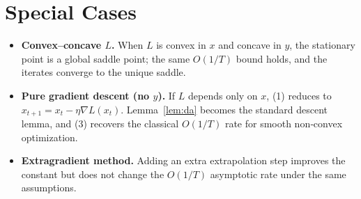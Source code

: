 \documentclass{article}
\begin{document}
\section*{Special Cases}
\begin{itemize}
\item \textbf{Convex–concave $L$.}  When $L$ is convex in $x$ and concave in $y$,
the stationary point is a global saddle point; the same $O(1/T)$ bound holds,
and the iterates converge to the unique saddle.
\item \textbf{Pure gradient descent (no $y$).}
If $L$ depends only on $x$, (1) reduces to $x_{t+1}=x_t-\eta\nabla L(x_t)$.
Lemma~\ref{lem:da} becomes the standard descent lemma, and (3) recovers the
classical $O(1/T)$ rate for smooth non‑convex optimization.
\item \textbf{Extragradient method.}
Adding an extra extrapolation step improves the constant but does not change
the $O(1/T)$ asymptotic rate under the same assumptions.
\end{itemize}
\end{document}
